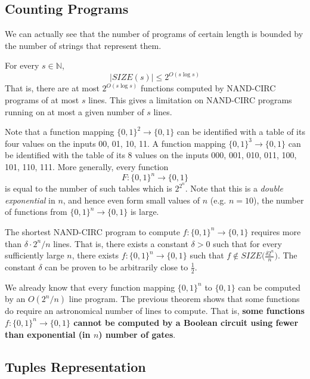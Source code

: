 \subsection{Counting Programs}

  We can actually see that the number of programs of certain length is bounded by the number of strings that represent them. 

  \begin{theorem}
  For every $s \in \mathbb{N}$, 
  \[|SIZE(s)| \leq 2^{O(s \log s)}\]
  That is, there are at most $2^{O (s \log s)}$ functions computed by NAND-CIRC programs of at most $s$ lines. This gives a limitation on NAND-CIRC programs running on at most a given number of $s$ lines. 
  \end{theorem}

  Note that a function mapping $\{0,1\}^2 \longrightarrow \{0, 1\}$ can be identified with a table of its four values on the inputs 00, 01, 10, 11. A function mapping $\{0,1\}^3 \longrightarrow \{0,1\}$ can be identified with the table of its 8 values on the inputs 000, 001, 010, 011, 100, 101, 110, 111. More generally, every function 
  \[F: \{0,1\}^n \longrightarrow \{0,1\}\]
  is equal to the number of such tables which is $2^{2^n}$. Note that this is a \textit{double exponential} in $n$, and hence even form small values of $n$ (e.g. $n = 10$), the number of functions from $\{0,1\}^n \longrightarrow \{0,1\}$ is large. 

  \begin{theorem}
  The shortest NAND-CIRC program to compute $f: \{0,1\}^n \longrightarrow \{0,1\}$ requires more than $\delta \cdot 2^n / n$ lines. That is, there exists a constant $\delta > 0$ such that for every sufficiently large $n$, there exists $f: \{0,1\}^n \longrightarrow \{0,1\}$ such that $f \not\in SIZE\Big( \frac{\delta 2^n}{n}\Big)$. The constant $\delta$ can be proven to be arbitrarily close to $\frac{1}{2}$. 
  \end{theorem}

  We already know that every function mapping $\{0,1\}^n$ to $\{0,1\}$ can be computed by an $O(2^n / n)$ line program. The previous theorem shows that some functions do require an astronomical number of lines to compute. That is, \textbf{some functions $f: \{0,1\}^n \longrightarrow \{0,1\}$ cannot be computed by a Boolean circuit using fewer than exponential (in $n$) number of gates}. 

\subsection{Tuples Representation}

